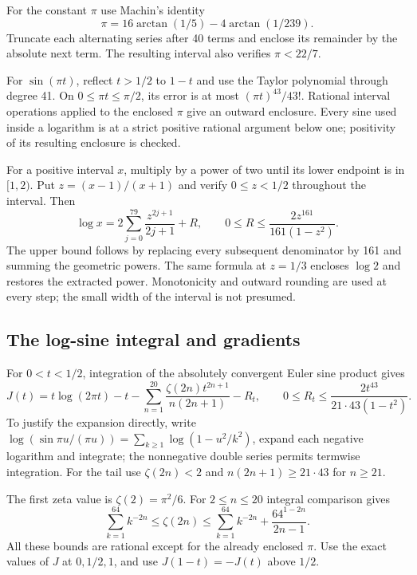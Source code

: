 For the constant $\pi$ use Machin's identity
\[
 \pi=16\arctan(1/5)-4\arctan(1/239).
\]
Truncate each alternating series after 40 terms and enclose its remainder by the absolute next term. The resulting interval also verifies $\pi<22/7$.

For $\sin(\pi t)$, reflect $t>1/2$ to $1-t$ and use the Taylor polynomial through degree 41. On $0\le\pi t\le\pi/2$, its error is at most $(\pi t)^{43}/43!$. Rational interval operations applied to the enclosed $\pi$ give an outward enclosure. Every sine used inside a logarithm is at a strict positive rational argument below one; positivity of its resulting enclosure is checked.

For a positive interval $x$, multiply by a power of two until its lower endpoint is in $[1,2)$. Put $z=(x-1)/(x+1)$ and verify $0\le z<1/2$ throughout the interval. Then
\begin{equation}\label{cs:log-series}
 \log x=2\sum_{j=0}^{79}\frac{z^{2j+1}}{2j+1}+R,
 \qquad 0\le R\le\frac{2z^{161}}{161(1-z^2)}.
\end{equation}
The upper bound follows by replacing every subsequent denominator by 161 and summing the geometric powers. The same formula at $z=1/3$ encloses $\log2$ and restores the extracted power. Monotonicity and outward rounding are used at every step; the small width of the interval is not presumed.

\subsection{The log-sine integral and gradients}
For $0<t<1/2$, integration of the absolutely convergent Euler sine product gives
\begin{equation}\label{cs:J-series}
 J(t)=t\log(2\pi t)-t-
 \sum_{n=1}^{20}\frac{\zeta(2n)t^{2n+1}}{n(2n+1)}-R_t,
 \qquad
 0\le R_t\le\frac{2t^{43}}{21\cdot43(1-t^2)}.
\end{equation}
To justify the expansion directly, write
$\log(\sin\pi u/(\pi u))
=\sum_{k\ge1}\log(1-u^2/k^2)$, expand each negative logarithm and integrate; the nonnegative double series permits termwise integration. For the tail use $\zeta(2n)<2$ and $n(2n+1)\ge21\cdot43$ for $n\ge21$.

The first zeta value is $\zeta(2)=\pi^2/6$. For $2\le n\le20$ integral comparison gives
\[
 \sum_{k=1}^{64}k^{-2n}
 \le\zeta(2n)\le
 \sum_{k=1}^{64}k^{-2n}+
 \frac{64^{1-2n}}{2n-1}.
\]
All these bounds are rational except for the already enclosed $\pi$. Use the exact values of $J$ at $0,1/2,1$, and use $J(1-t)=-J(t)$ above $1/2$.

